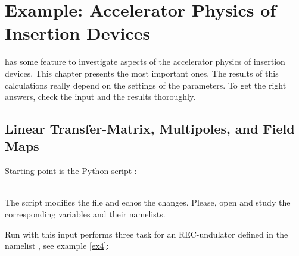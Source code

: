 \section{Example: Accelerator Physics of Insertion Devices} \label{ex12}

\W has some feature to investigate aspects of the accelerator physics
of insertion devices. This chapter presents the most important ones.
The results of this calculations really depend on the settings of the
parameters. To get the right answers, check the input and the results
thoroughly.

\subsection{Linear Transfer-Matrix, Multipoles, and Field Maps} \label{ex12a}

Starting point is the Python script :

\\

The script modifies the file \we \bsp and echos the changes. Please, open
\wi \bsp and study the corresponding variables and their namelists.

Run with this input \W performs three task for an REC-undulator
defined in the namelist , see example \ref{ex4}:

